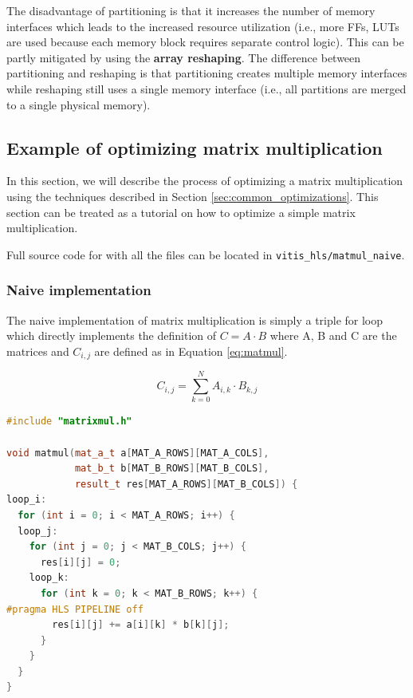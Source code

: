 \documentclass[a4paper, twoside]{report}
\theoremstyle{definition}
\numberwithin{equation}{section}
\begin{document}
The disadvantage of partitioning is that it increases the number of memory interfaces
which leads to the increased resource utilization (i.e., more FFs, LUTs are used because each memory block requires separate control logic).
This can be partly mitigated by using the \textbf{array reshaping}.
The difference between partitioning and reshaping is that partitioning
creates multiple memory interfaces while reshaping still uses a single memory interface
(i.e., all partitions are merged to a single physical memory).

\subsection{Example of optimizing matrix multiplication}

In this section, we will describe the process of optimizing a matrix multiplication
using the techniques described in Section \ref{sec:common_optimizations}.
This section can be treated as a tutorial on how to optimize a simple matrix multiplication.

Full source code for with all the files can be located in \texttt{vitis\_hls/matmul\_naive}.

\subsubsection{Naive implementation}

The naive implementation of matrix multiplication is simply a triple for loop
which directly implements the definition of $C = A \cdot B$ where A, B and C are the matrices
and $C_{i,j}$ are defined as in Equation \ref{eq:matmul}.

\begin{equation} \label{eq:matmul}
    C_{i,j} = \sum_{k=0}^{N} A_{i,k} \cdot B_{k,j}
\end{equation}


\begin{lstlisting}[language=c++,numbers=none]
#include "matrixmul.h"

void matmul(mat_a_t a[MAT_A_ROWS][MAT_A_COLS],
            mat_b_t b[MAT_B_ROWS][MAT_B_COLS],
            result_t res[MAT_A_ROWS][MAT_B_COLS]) {
loop_i:
  for (int i = 0; i < MAT_A_ROWS; i++) {
  loop_j:
    for (int j = 0; j < MAT_B_COLS; j++) {
      res[i][j] = 0;
    loop_k:
      for (int k = 0; k < MAT_B_ROWS; k++) {
#pragma HLS PIPELINE off
        res[i][j] += a[i][k] * b[k][j];
      }
    }
  }
}
\end{lstlisting}
\end{document}
